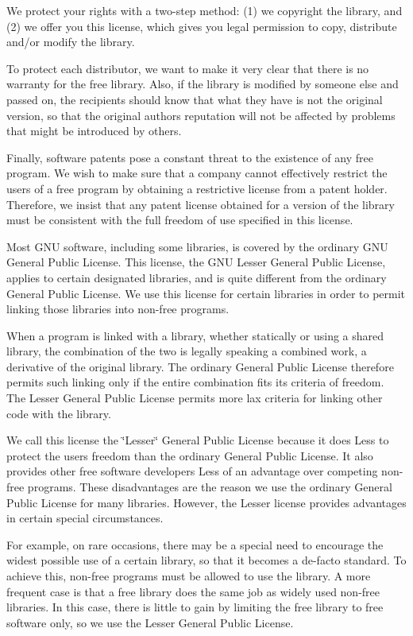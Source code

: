 We protect your rights with a two-\/step method\+: (1) we copyright the library, and (2) we offer you this license, which gives you legal permission to copy, distribute and/or modify the library.

To protect each distributor, we want to make it very clear that there is no warranty for the free library. Also, if the library is modified by someone else and passed on, the recipients should know that what they have is not the original version, so that the original author\textquotesingle{}s reputation will not be affected by problems that might be introduced by others.

Finally, software patents pose a constant threat to the existence of any free program. We wish to make sure that a company cannot effectively restrict the users of a free program by obtaining a restrictive license from a patent holder. Therefore, we insist that any patent license obtained for a version of the library must be consistent with the full freedom of use specified in this license.

Most G\+NU software, including some libraries, is covered by the ordinary G\+NU General Public License. This license, the G\+NU Lesser General Public License, applies to certain designated libraries, and is quite different from the ordinary General Public License. We use this license for certain libraries in order to permit linking those libraries into non-\/free programs.

When a program is linked with a library, whether statically or using a shared library, the combination of the two is legally speaking a combined work, a derivative of the original library. The ordinary General Public License therefore permits such linking only if the entire combination fits its criteria of freedom. The Lesser General Public License permits more lax criteria for linking other code with the library.

We call this license the \char`\"{}\+Lesser\char`\"{} General Public License because it does Less to protect the user\textquotesingle{}s freedom than the ordinary General Public License. It also provides other free software developers Less of an advantage over competing non-\/free programs. These disadvantages are the reason we use the ordinary General Public License for many libraries. However, the Lesser license provides advantages in certain special circumstances.

For example, on rare occasions, there may be a special need to encourage the widest possible use of a certain library, so that it becomes a de-\/facto standard. To achieve this, non-\/free programs must be allowed to use the library. A more frequent case is that a free library does the same job as widely used non-\/free libraries. In this case, there is little to gain by limiting the free library to free software only, so we use the Lesser General Public License.


